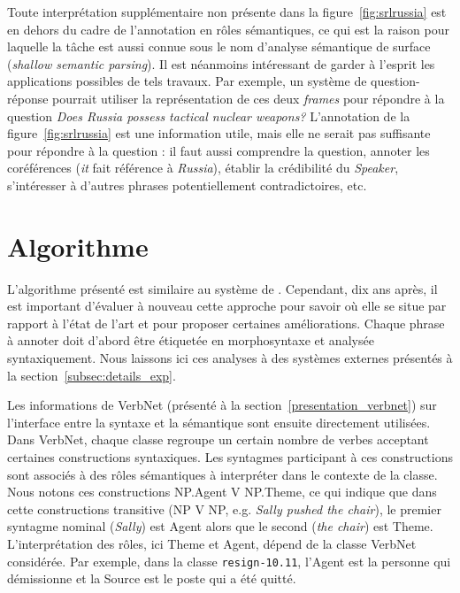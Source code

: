 Toute interprétation supplémentaire non présente dans la
figure~\ref{fig:srlrussia} est en dehors du cadre de l'annotation en rôles
sémantiques, ce qui est la raison pour laquelle la tâche est aussi connue sous
le nom d'analyse sémantique de surface (\emph{shallow semantic parsing}).  Il
est néanmoins intéressant de garder à l'esprit les applications possibles de
tels travaux. Par exemple, un système de question-réponse pourrait utiliser la
représentation de ces deux \emph{frames} pour répondre à la question \emph{Does
Russia possess tactical nuclear weapons?} L'annotation de la
figure~\ref{fig:srlrussia} est une information utile, mais elle ne serait pas
suffisante pour répondre à la question : il faut aussi comprendre la question,
annoter les coréférences (\emph{it} fait référence à \emph{Russia}), établir la
crédibilité du \emph{Speaker}, s'intéresser à d'autres phrases potentiellement
contradictoires, etc.

\section{Algorithme}

L'algorithme présenté est similaire au système de
\cite{swier2004unsupervised,swier2005exploiting}. Cependant, dix ans après, il
est important d'évaluer à nouveau cette approche pour savoir où elle se situe
par rapport à l'état de l'art et pour proposer certaines améliorations. Chaque
phrase à annoter doit d'abord être étiquetée en morphosyntaxe et analysée
syntaxiquement. Nous laissons ici ces analyses à des systèmes externes
présentés à la section~\ref{subsec:details_exp}.

Les informations de VerbNet (présenté à la section~\ref{presentation_verbnet})
sur l'interface entre la syntaxe et la sémantique sont ensuite directement
utilisées. Dans VerbNet, chaque classe regroupe un certain nombre de verbes
acceptant certaines constructions syntaxiques. Les syntagmes participant à ces
constructions sont associés à des rôles sémantiques à interpréter dans le
contexte de la classe.  Nous notons ces constructions NP.Agent V NP.Theme, ce
qui indique que dans cette constructions transitive (NP V NP, e.g. \emph{Sally
pushed the chair}), le premier syntagme nominal (\emph{Sally}) est Agent alors
que le second (\emph{the chair}) est Theme. L'interprétation des rôles, ici
Theme et Agent, dépend de la classe VerbNet considérée. Par exemple, dans la
classe \texttt{resign-10.11}, l'Agent est la personne qui démissionne et la
Source est le poste qui a été quitté.

